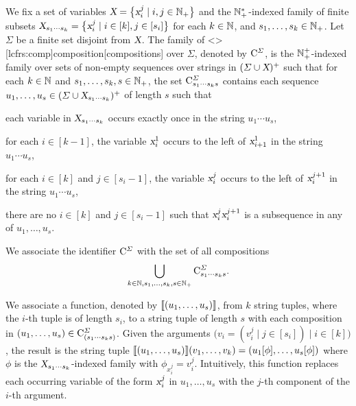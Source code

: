 \documentclass[../../document.tex]{subfiles}
\begin{document}
    \begin{definition}[Compositions]\label{def:lcfrs:comp}
        We fix a set of variables \(\textsl{X} = \big\{ \textsl{x}_i^j \mid i, j \in \mathbb{N}_+ \big\}\) and the \(\mathbb{N}_+^*\)-indexed family of finite subsets \(\textsl{X}_{s_1\cdots s_k} = \big\{ \textsl{x}_i^j \mid i \in [k], j \in [s_i] \big\}\) for each \(k \in \mathbb{N}\), and \(s_1, \ldots, s_k \in \mathbb{N}_+\).
        Let \(\varSigma\) be a finite set disjoint from \(\textsl{X}\).
        The family of  <\lcfrs>[lcfrs:comp]{composition}[compositions] over \(\varSigma\), denoted by \(\mathrm{C}^\varSigma\), is the \(\mathbb{N}_+^+\)-indexed family over sets of non-empty sequences over strings in \((\varSigma \cup \textsl{X})^+\) such that for each \(k \in \mathbb{N}\) and \(s_1, \ldots, s_k, s \in \mathbb{N}_+\), the set \(\mathrm{C}^\varSigma_{s_1 \cdots s_k s}\) contains each sequence \(u_1, \ldots, u_s \in (\varSigma \cup \textsl{X}_{s_1 \cdots s_k})^+\) of length \(s\) such that
        \begin{compactenum}
            \item each variable in \(\textsl{X}_{s_1 \cdots s_k}\) occurs exactly once in the string \(u_1 \cdots u_s\),
            \item for each \(i \in [k-1]\), the variable \(\textsl{x}_i^1\) occurs to the left of \(\textsl{x}_{i+1}^1\) in the string \(u_1 \cdots u_s\),
            \item for each \(i \in [k]\) and \(j \in [s_i-1]\), the variable \(\textsl{x}_i^j\) occurs to the left of \(\textsl{x}_i^{j+1}\) in the string \(u_1 \cdots u_s\),
            \item there are no \(i \in [k]\) and \(j \in [s_i-1]\) such that \(\textsl{x}^j_i\textsl{x}^{j+1}_i\) is a subsequence in any of \(u_1, \ldots, u_s\).
        \end{compactenum}
        We associate the identifier \(\mathrm{C}^\varSigma\) with the set of all  compositions \[
        \bigcup_{k \in \mathbb{N}, s_1, \ldots, s_k, s \in \mathbb{N}_+} \mathrm{C}^{\varSigma}_{s_1 \cdots s_k s} \text{.}
        \]

        We associate a function, denoted by \(\llbracket(u_1, \ldots, u_s)\rrbracket\), from \(k\) string tuples, where the \(i\)-th tuple is of length \(s_i\), to a string tuple of length \(s\) with each composition in \((u_1, \ldots, u_s) \in \mathrm{C}^\varSigma_{(s_1\cdots s_k s)}\).
        Given the arguments \(\big(v_i = (v_i^j \mid j \in [s_i]) \mid i \in [k]\big)\), the result is the string tuple \(
        \llbracket(u_1, \ldots, u_s)\rrbracket(v_1, \ldots, v_k) = (u_1[\phi], \ldots, u_s[\phi])
        \) where \(\phi\) is the \(\textsl{X}_{s_1 \cdots s_k}\)-indexed family with \(\phi_{x_i^j} = v_i^j\).
        Intuitively, this function replaces each occurring variable of the form \(\textsl{x}_i^j\) in \(u_1, \ldots, u_s\) with the \(j\)-th component of the \(i\)-th argument.
    \end{definition}
\end{document}
